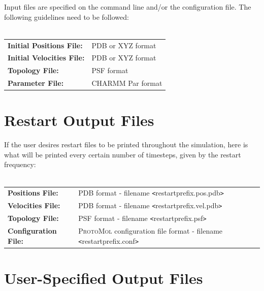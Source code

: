 \documentclass[11pt]{report}
\newcommand{\ProtoMol}{\textsc{ProtoMol }}
\newcommand{\tempstart}{\texttt{<}}
\newcommand{\tempend}{\texttt{>}}
\begin{document}
Input files are specified on the command line and/or the configuration
 file.  The following guidelines need to be followed:
\\
\\
\begin{tabular}{ll}
{\bf Initial Positions File:}& PDB or XYZ format\\
{\bf Initial Velocities File:}& PDB or XYZ format\\
{\bf Topology File:}& PSF format\\
{\bf Parameter File:}& CHARMM Par format
\end{tabular}

\section{Restart Output Files}

If the user desires restart files to be printed throughout the
simulation, here is what will be printed every certain number of
timesteps, given by the restart frequency:
\\
\\
\begin{tabular}{ll}
{\bf Positions File:}& PDB format - filename \tempstart restartprefix.pos.pdb\tempend  \\
{\bf Velocities File:}& PDB format - filename \tempstart restartprefix.vel.pdb\tempend  \\
{\bf Topology File:}& PSF format - filename \tempstart restartprefix.psf\tempend  \\
{\bf Configuration File:}& \ProtoMol configuration file format - filename \tempstart restartprefix.conf\tempend 
\end{tabular}



\section{User-Specified Output Files}
\end{document}
